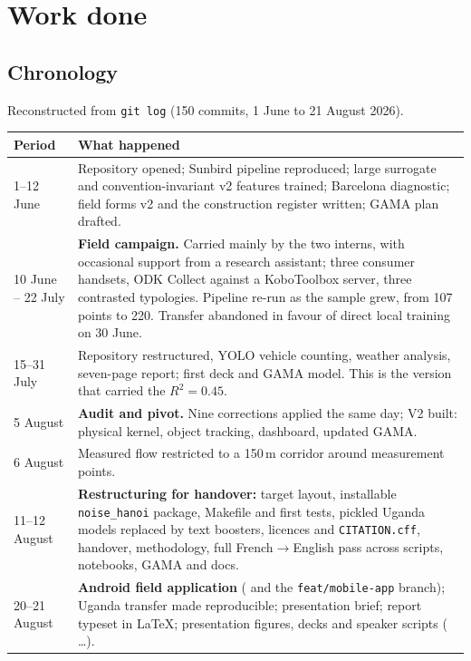 \documentclass[11pt,a4paper]{article}
\newcommand{\pth}[1]{\texttt{\small #1}}
\begin{document}
\section{Work done}

\subsection{Chronology}

Reconstructed from \pth{git log} (150 commits, 1 June to 21 August 2026).

\begin{center}\small
\begin{tabular}{@{}p{2.6cm}p{11.2cm}@{}}
\toprule
\textbf{Period} & \textbf{What happened} \\
\midrule
1--12 June & Repository opened; Sunbird pipeline reproduced;
 large surrogate and convention-invariant v2 features trained; Barcelona diagnostic; field forms v2 and the
 construction register written; GAMA plan
 drafted. \\
10 June -- 22 July & \textbf{Field campaign.} Carried mainly by the two interns, with
 occasional support from a research assistant; three consumer handsets, ODK
 Collect against a KoboToolbox server, three contrasted typologies. Pipeline re-run as the sample grew, from 107 points to 220. Transfer
 abandoned in favour of direct local training on 30 June. \\
15--31 July & Repository restructured, YOLO vehicle counting, weather analysis,
 seven-page report; first deck and GAMA model.
 This is the version that carried the $R^2 = 0.45$. \\
5 August & \textbf{Audit and pivot.} Nine corrections applied the same day; V2
 built: physical kernel, object tracking, dashboard, updated GAMA. \\
6 August & Measured flow restricted to a 150\,m corridor around measurement
 points. \\
11--12 August & \textbf{Restructuring for handover:} target layout, installable \pth{noise\_hanoi} package,
 Makefile and first tests, pickled Uganda models replaced by
 text boosters, licences and \pth{CITATION.cff}, handover, methodology,
 full French$\to$English pass across scripts, notebooks, GAMA and docs. \\
20--21 August & \textbf{Android field application} ( and the
 \pth{feat/mobile-app} branch); Uganda transfer made reproducible; presentation brief; report typeset in
 LaTeX; presentation figures, decks and speaker scripts
 ( \ldots). \\
\bottomrule
\end{tabular}
\end{center}
\end{document}
